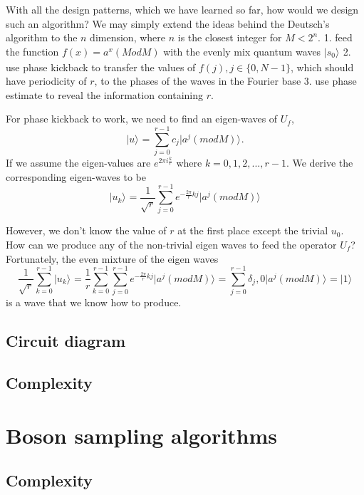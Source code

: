 \documentclass{book}
\newcommand{\keta}[2][]{\vert {#2} \rangle_{#1}}
\begin{document}
With all the design patterns, which we have learned so far, how would we design such an algorithm? We may simply extend the ideas behind the Deutsch's algorithm to the $n$ dimension, where $n$ is the closest integer for $M < 2^n$.
1. feed the function $f(x) = a^x (Mod M)$ with the evenly mix quantum waves $\keta{s_0}$
2. use phase kickback to transfer the values of $f(j), j\in \{0,N-1\}$, which should have periodicity of $r$, to the phases of the waves in the Fourier base
3. use phase estimate to reveal the information containing $r$.

For phase kickback to work, we need to find an eigen-waves of $U_f$,
\begin{equation}\label{keta_u}
    \keta{u} = \sum^{r-1}_{j=0} c_j \keta{a^j (mod M)}.
\end{equation}
If we assume the eigen-values are $e^{2\pi i \frac k r}$ where $k=0, 1, 2, ..., r-1$. We derive the corresponding eigen-waves to be
\begin{equation}\label{keta_u}
    \keta{u_k} = \frac 1 {\sqrt{r}} \sum^{r-1}_{j=0} e^{-{\frac {2\pi} r} kj} \keta{a^j (mod M)}
\end{equation}

However, we don't know the value of $r$ at the first place except the trivial $u_0$. How can we produce any of the non-trivial eigen waves to feed the operator $U_f$? Fortunately, the even mixture of the eigen waves
\begin{equation}\label{keta_u}
    \frac 1 {\sqrt{r}} \sum^{r-1}_{k=0}\keta{u_k} = \frac 1 r \sum^{r-1}_{k=0} \sum^{r-1}_{j=0} e^{-{\frac {2\pi} r} kj} \keta{a^j (mod M)} = \sum^{r-1}_{j=0} \delta_j,0 \keta{a^j (mod M)} = \keta{1}
\end{equation}
is a wave that we know how to produce.

\subsection{Circuit diagram}

\subsection{Complexity}

\section{Boson sampling algorithms}

\subsection{Complexity}
\end{document}
